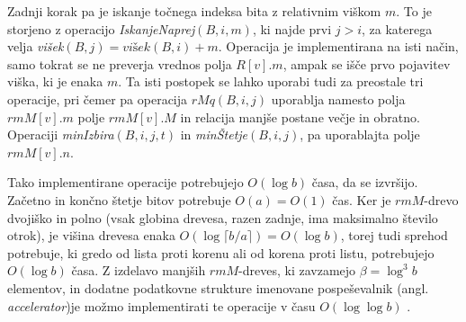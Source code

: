 Zadnji korak pa je iskanje točnega indeksa bita z relativnim viškom $m$. To je storjeno z operacijo \textit{IskanjeNaprej}$(B,i,m)$, ki najde prvi $j> i$, za katerega velja \textit{višek}$(B,j)=\textit{višek}(B,i)+m$. Operacija je implementirana na isti način, samo tokrat se ne preverja vrednos polja $R[v].m$, ampak se išče prvo pojavitev viška, ki je enaka $m$. Ta isti  postopek se lahko uporabi tudi za preostale tri operacije, pri čemer pa operacija $rMq(B,i,j)$ uporablja namesto polja $rmM[v].m$ polje $rmM[v].M$ in relacija manjše postane večje in obratno. Operaciji \textit{minIzbira}$(B,i,j,t)$ in \textit{minŠtetje}$(B,i,j)$, pa uporablajta polje $rmM[v].n$\cite{Navarro2016}.

Tako implementirane operacije potrebujejo $O(\log{b})$ časa, da se izvršijo. Začetno in končno štetje bitov potrebuje $O(a)=O(1)$ čas. Ker je $rmM$-drevo dvojiško in polno (vsak globina drevesa, razen zadnje, ima maksimalno število otrok),  je višina drevesa enaka $O(\log{\lceil b/a\rceil})=O(\log{b})$, torej tudi sprehod potrebuje, ki gredo od lista proti korenu ali od korena proti listu, potrebujejo $O(\log{b})$ časa. Z izdelavo manjših $rmM$-dreves, ki zavzamejo $\beta=\log^3{b}$ elementov, in dodatne podatkovne strukture imenovane pospeševalnik (angl. \textit{accelerator})je možmo implementirati te operacije v času $O(\log\log{b})$ \cite{Navarro2016}.